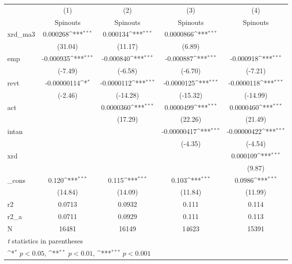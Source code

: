 {
\def\sym#1{\ifmmode^{#1}\else\(^{#1}\)\fi}
\begin{tabular}{l*{4}{c}}
\hline\hline
            &\multicolumn{1}{c}{(1)}&\multicolumn{1}{c}{(2)}&\multicolumn{1}{c}{(3)}&\multicolumn{1}{c}{(4)}\\
            &\multicolumn{1}{c}{Spinouts}&\multicolumn{1}{c}{Spinouts}&\multicolumn{1}{c}{Spinouts}&\multicolumn{1}{c}{Spinouts}\\
\hline
xrd\_ma3     &    0.000268\sym{***}&    0.000134\sym{***}&   0.0000866\sym{***}&                     \\
            &     (31.04)         &     (11.17)         &      (6.89)         &                     \\
[1em]
emp         &   -0.000935\sym{***}&   -0.000840\sym{***}&   -0.000887\sym{***}&   -0.000918\sym{***}\\
            &     (-7.49)         &     (-6.58)         &     (-6.70)         &     (-7.21)         \\
[1em]
revt        & -0.00000114\sym{*}  &  -0.0000112\sym{***}&  -0.0000125\sym{***}&  -0.0000118\sym{***}\\
            &     (-2.46)         &    (-14.28)         &    (-15.32)         &    (-14.99)         \\
[1em]
act         &                     &   0.0000360\sym{***}&   0.0000499\sym{***}&   0.0000460\sym{***}\\
            &                     &     (17.29)         &     (22.26)         &     (21.49)         \\
[1em]
intan       &                     &                     & -0.00000417\sym{***}& -0.00000422\sym{***}\\
            &                     &                     &     (-4.35)         &     (-4.54)         \\
[1em]
xrd         &                     &                     &                     &    0.000109\sym{***}\\
            &                     &                     &                     &      (9.87)         \\
[1em]
\_cons      &       0.120\sym{***}&       0.115\sym{***}&       0.103\sym{***}&      0.0986\sym{***}\\
            &     (14.84)         &     (14.09)         &     (11.84)         &     (11.99)         \\
\hline
r2          &      0.0713         &      0.0932         &       0.111         &       0.114         \\
r2\_a        &      0.0711         &      0.0929         &       0.111         &       0.113         \\
N           &       16481         &       16149         &       14623         &       15391         \\
\hline\hline
\multicolumn{5}{l}{\footnotesize \textit{t} statistics in parentheses}\\
\multicolumn{5}{l}{\footnotesize \sym{*} \(p<0.05\), \sym{**} \(p<0.01\), \sym{***} \(p<0.001\)}\\
\end{tabular}
}
